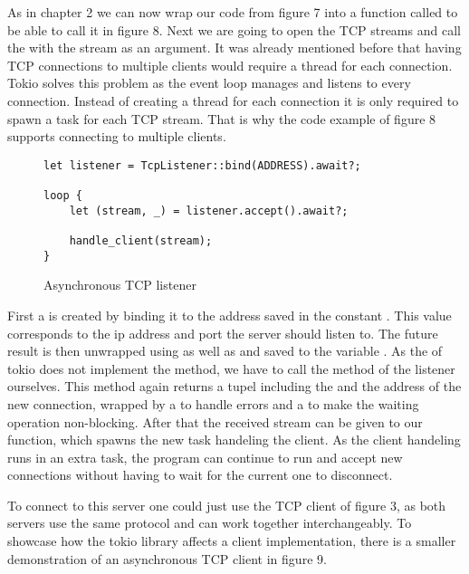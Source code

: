 As in chapter 2 we can now wrap our code from figure 7 into a function called  to be able to call
it in figure 8. Next we are going to open the TCP streams and call the  with the stream as an
argument. It was already mentioned before that having TCP connections to multiple clients would require a thread for
each connection. Tokio solves this problem as the event loop manages and listens to every connection. Instead of
creating a thread for each connection it is only required to spawn a task for each TCP stream. That is why the code
example of figure 8 supports connecting to multiple clients.

\begin{figure}[ht]
    \begin{verbatim}
let listener = TcpListener::bind(ADDRESS).await?;

loop {
    let (stream, _) = listener.accept().await?;

    handle_client(stream);
}
    \end{verbatim}
    \caption{Asynchronous TCP listener}
\end{figure}

First a  is created by binding it to the address saved in the  constant
. This value corresponds to the ip address and port the server should listen to. The future result is
then unwrapped using  as well as  and saved to the variable . As the
 of tokio does not implement the  method, we have to call the  method of
the listener ourselves. This method again returns a tupel including the  and the address of the new
connection, wrapped by a  to handle errors and a  to make the waiting operation non-blocking.
After that the received stream can be given to our  function, which spawns the new task handeling
the client. As the client handeling runs in an extra task, the program can continue to run and accept new connections
without having to wait for the current one to disconnect.

To connect to this server one could just use the TCP client of figure 3, as both servers use the same protocol and can
work together interchangeably. To showcase how the tokio library affects a client implementation, there is a smaller
demonstration of an asynchronous TCP client in figure 9.

